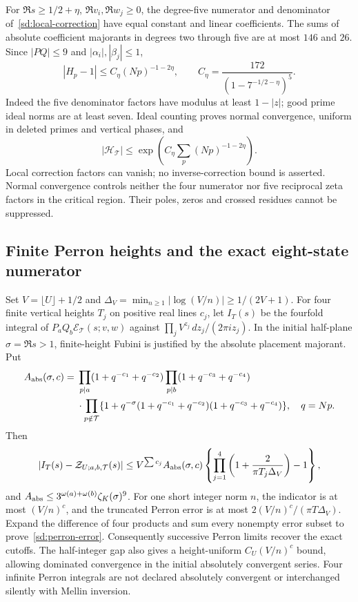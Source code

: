 \documentclass[11pt]{article}
\theoremstyle{definition}\newtheorem{definition}[theorem]{Definition}
\theoremstyle{remark}\newtheorem{remark}[theorem]{Remark}
\begin{document}
For $\Re s\ge1/2+\eta$, $\Re v_i,\Re w_j\ge0$, the degree-five
numerator and denominator of~\eqref{sd:local-correction} have equal
constant and linear coefficients. The sums of absolute coefficient
majorants in degrees two through five are at most $146$ and $26$.
Since $|PQ|\le9$ and $|\alpha_i|,|\beta_j|\le1$,
\begin{equation}\label{sd:normal}
 |H_p-1|\le C_\eta(Np)^{-1-2\eta},\qquad
 C_\eta=\frac{172}{(1-7^{-1/2-\eta})^5}.
\end{equation}
Indeed the five denominator factors have modulus at least $1-|z|$;
good prime ideal norms are at least seven. Ideal counting proves normal
convergence, uniform in deleted primes and vertical phases, and
\[
 |\mathcal H_{\mathcal T}|
 \le\exp\left(C_\eta\sum_p(Np)^{-1-2\eta}\right).
\]
Local correction factors can vanish; no inverse-correction bound is
asserted. Normal convergence controls neither the four numerator nor
five reciprocal zeta factors in the critical region. Their poles, zeros
and crossed residues cannot be suppressed.

\subsection{Finite Perron heights and the exact eight-state numerator}
Set $V=\lfloor U\rfloor+1/2$ and
$\Delta_V=\min_{n\ge1}|\log(V/n)|\ge1/(2V+1)$.
For four finite vertical heights $T_j$ on positive real lines $c_j$,
let $I_T(s)$ be the fourfold integral of
$P_aQ_b\mathcal E_{\mathcal T}(s;v,w)$ against
$\prod_j V^{z_j}\,dz_j/(2\pi i z_j)$.
In the initial half-plane $\sigma=\Re s>1$, finite-height Fubini is
justified by the absolute placement majorant. Put
\[
 \begin{split}
 A_{\rm abs}(\sigma,c)={}&
 \prod_{p\mid a}(1+q^{-c_1}+q^{-c_2})
 \prod_{p\mid b}(1+q^{-c_3}+q^{-c_4})\\
 &{}\cdot\prod_{p\notin\mathcal T}
 \{1+q^{-\sigma}(1+q^{-c_1}+q^{-c_2})
                     (1+q^{-c_3}+q^{-c_4})\},\quad q=Np.
 \end{split}
\]
Then
\begin{equation}\label{sd:perron-error}
 |I_T(s)-\mathcal Z_{U;a,b,\mathcal T}(s)|
 \le V^{\sum c_j}A_{\rm abs}(\sigma,c)
 \left\{\prod_{j=1}^4
    \left(1+\frac{2}{\pi T_j\Delta_V}\right)-1\right\},
\end{equation}
and $A_{\rm abs}\le3^{\omega(a)+\omega(b)}\zeta_K(\sigma)^9$.
For one short integer norm $n$, the indicator is at most $(V/n)^c$,
and the truncated Perron error is at most
$2(V/n)^c/(\pi T\Delta_V)$. Expand the difference of four products and
sum every nonempty error subset to prove~\eqref{sd:perron-error}.
Consequently successive Perron limits recover the exact cutoffs.
The half-integer gap also gives a height-uniform $C_U(V/n)^c$ bound,
allowing dominated convergence in the initial absolutely convergent
series. Four infinite Perron integrals are not declared absolutely
convergent or interchanged silently with Mellin inversion.
\end{document}
